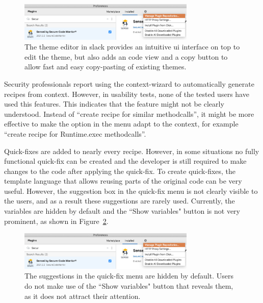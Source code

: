 \begin{figure}
  \centering
  \includegraphics[width=0.75\textwidth,page=16]{04-tools/figures/figures2.pdf}
  
  \caption[Slack theme editor]{The theme editor in slack provides an intuitive \gls{ui} interface on top to edit the theme, but also adds an code view and a copy button to allow fast and easy copy-pasting of existing themes.}
  \label{fig:slacktheme} 
\end{figure}

Security professionals report using the context-wizard to automatically generate recipes from context.
However, in usability tests, none of the tested users have used this features.
This indicates that the feature might not be clearly understood.
Instead of “create recipe for similar methodcalls”, it might be more effective to make the option in the menu adapt to the context, for example “create recipe for Runtime.exec methodcalls”.

Quick-fixes are added to nearly every recipe.
However, in some situations no fully functional quick-fix can be created and the developer is still required to make changes to the code after applying the quick-fix.
To create quick-fixes, the template language that allows reusing parts of the original code can be very useful.
However, the suggestion box in the quick-fix menu is not clearly visible to the users, and as a result these suggestions are rarely used.
Currently, the variables are hidden by default and the ``Show variables" button is not very prominent, as shown in Figure~\ref{fig:showvariables}.

\begin{figure}
  \centering
  \includegraphics[width=0.75\textwidth,page=15]{04-tools/figures/figures2.pdf}
  \caption[Show variables button in the fix menu]{The suggestions in the quick-fix menu are hidden by default. Users do not make use of the ``Show variables" button that reveals them, as it does not attract their attention.}
  \label{fig:showvariables} 
\end{figure}

